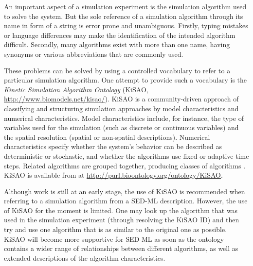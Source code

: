 \label{sec:kisao}

An important aspect of a simulation experiment is the simulation algorithm used to solve the system.
But the sole reference of a simulation algorithm through its name in form of a string is error prone and unambiguous. Firstly, typing mistakes or language differences may make the identification of the intended algorithm difficult. Secondly, many algorithms exist with more than one name, having synonyms or various abbreviations that are commonly used.

These problems can be solved by using a controlled vocabulary to refer to a particular simulation algorithm. One attempt to provide such a vocabulary is the \emph{Kinetic Simulation Algorithm Ontology} (KiSAO, \url{http://www.biomodels.net/kisao/}). KiSAO is a community-driven approach of classifying and structuring simulation approaches by model characteristics and numerical characteristics.  Model characteristics include, for instance, the type of variables used for the simulation (such as discrete or continuous variables) and the spatial resolution (spatial or non-spatial descriptions). Numerical characteristics specify whether the system's behavior can be described as deterministic or stochastic, and whether the algorithms use fixed or adaptive time steps.  
Related algorithms are grouped together, producing classes of algorithms \citep{CWK+10}.
KiSAO is available from  at \url{http://purl.bioontology.org/ontology/KiSAO}.
%
%

Although work is still at an early stage, the use of KiSAO is recommended when referring to a simulation algorithm from a SED-ML description. However, the use of KiSAO for the moment is limited. One may look up the algorithm that was used in the simulation experiment (through resolving the KiSAO ID) and then try and use one algorithm that is as similar to the original one as possible. KiSAO will become more supportive for SED-ML as soon as the ontology contains a wider range of relationships between different algorithms, as well as extended descriptions of the algorithm characteristics.


